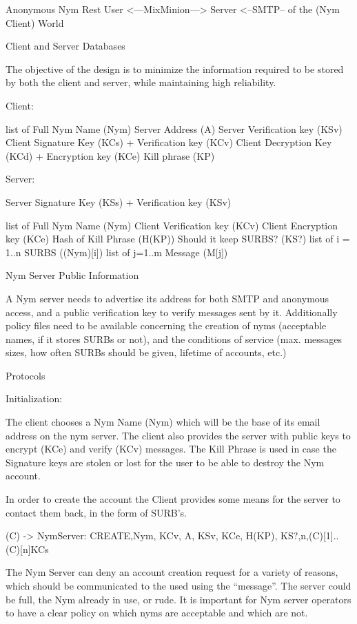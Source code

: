   Anonymous                      Nym             Rest 
     User    <---MixMinion---> Server <--SMTP-- of the
 (Nym Client)                                    World

Client and Server Databases

The objective of the design is to minimize the information required to
be stored by both the client and server, while maintaining high
reliability. 

Client:

list of {
  Full Nym Name (Nym)
  Server Address (A)
  Server Verification key (KSv)
  Client Signature Key (KCs) + Verification key (KCv)
  Client Decryption Key (KCd) + Encryption key (KCe)
  Kill phrase (KP)
}

Server:

Server Signature Key (KSs) + Verification key (KSv)

list of {
  Full Nym Name (Nym)
  Client Verification key (KCv)
  Client Encryption key (KCe)
  Hash of Kill Phrase (H(KP))
  Should it keep SURBS? (KS?)
  list of i = 1..n {
    SURBS ((Nym)[i])
  }
  list of j=1..m {
    Message (M[j])
  }
}

Nym Server Public Information

A Nym server needs to advertise its address for both SMTP and
anonymous access, and a public verification key to verify messages
sent by it. Additionally policy files need to be available concerning
the creation of nyms (acceptable names, if it stores SURBs or not),
and the conditions of service (max. messages sizes, how often SURBs
should be given, lifetime of accounts, etc.) 

Protocols

Initialization:

The client chooses a Nym Name (Nym) which will be the base of its
email address on the nym server. The client also provides the server
with public keys to encrypt (KCe) and verify (KCv) messages. The Kill
Phrase is used in case the Signature keys are stolen or lost for the
user to be able to destroy the Nym account. 

In order to create the account the Client provides some means for the
server to contact them back, in the form of SURB's.

(C) -> NymServer: {CREATE,Nym, KCv, A, KSv, KCe, H(KP), KS?,n,(C)[1]..(C)[n]}KCs

The Nym Server can deny an account creation request for a variety of
reasons, which should be communicated to the used using the
``message''. The server could be full, the Nym already in use, or rude.
It is important for Nym server operators to have a clear policy on
which nyms are acceptable and which are not.

